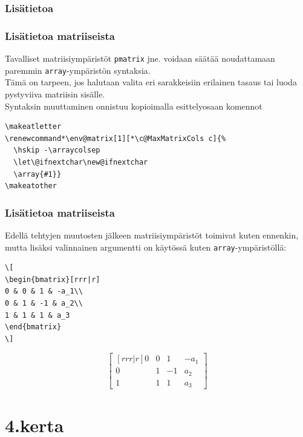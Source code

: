 \documentclass[handout]{beamer}
\makeatletter
\theoremstyle{remark}
\newcommand{\vaihto}{\\ \vspace{10pt}}
\renewcommand*\env@matrix[1][*\c@MaxMatrixCols c]{%
  \hskip -\arraycolsep
  \let\@ifnextchar\new@ifnextchar
  \array{#1}}
\makeatother
\begin{document}
\subsubsection{Lisätietoa}
\begin{frame}[fragile]
\frametitle{Lisätietoa matriiseista}
Tavalliset matriisiympäristöt \verb-pmatrix- jne. voidaan säätää noudattamaan paremmin \verb-array--ympäristön syntaksia.
\vaihto
Tämä on tarpeen, jos halutaan valita eri sarakkeisiin erilainen tasaus tai luoda pystyviiva matriisin sisälle. 
\vaihto
Syntaksin muuttaminen onnistuu kopioimalla esittelyosaan komennot\vaihto
\begin{Verbatim}[frame=single]
\makeatletter
\renewcommand*\env@matrix[1][*\c@MaxMatrixCols c]{%
  \hskip -\arraycolsep
  \let\@ifnextchar\new@ifnextchar
  \array{#1}}
\makeatother
\end{Verbatim}
\end{frame}
\begin{frame}[fragile]
\frametitle{Lisätietoa matriiseista}
Edellä tehtyjen muutosten jälkeen matriisiympäristöt toimivat kuten ennenkin, mutta lisäksi valinnainen argumentti on käytössä kuten \verb-array--ympäristöllä:
\vaihto
\begin{minipage}{4cm}
\begin{scriptsize}
\begin{Verbatim}[frame=single]
\[
\begin{bmatrix}[rrr|r]
0 & 0 & 1 & -a_1\\
0 & 1 & -1 & a_2\\
1 & 1 & 1 & a_3
\end{bmatrix}
\]
\end{Verbatim}
\end{scriptsize}
\end{minipage}
\begin{minipage}{4cm}
\[
\begin{bmatrix}[rrr|r]
0 & 0 & 1 & -a_1\\
0 & 1 & -1 & a_2\\
1 & 1 & 1 & a_3
\end{bmatrix}
\]
\end{minipage}
\end{frame}


\section{4.kerta}
\end{document}
